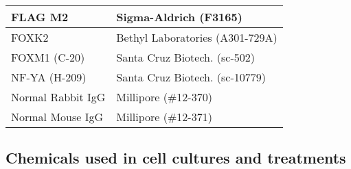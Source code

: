 {\begin{longtable}{|>{\raggedright\arraybackslash}m{4cm}|>{\raggedright\arraybackslash}m{7.5cm}|}
    FLAG M2 & Sigma-Aldrich (F3165)\\
    \hline
    FOXK2             & Bethyl Laboratories (A301-729A)\\
    \hline
    FOXM1 (C-20)      & Santa Cruz Biotech. (sc-502)\\
    \hline
    NF-YA (H-209)     & Santa Cruz Biotech. (sc-10779)\\
    \hline
    Normal Rabbit IgG & Millipore (\#12-370)\\
    \hline
    Normal Mouse IgG  & Millipore (\#12-371)\\
    \hline
\end{longtable}
}

\subsection{Chemicals used in cell cultures and treatments} \label{section:antibiotics}

